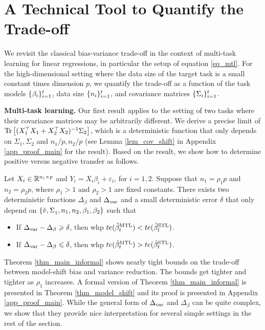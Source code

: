 \section{A Technical Tool to Quantify the Trade-off}
\label{sec_main}

We revisit the classical bias-variance trade-off in the context of multi-task learning for linear regressions, in particular the setup of equation \eqref{eq_mtl}.
For the high-dimensional setting where the data size of the target task is a small constant times dimension $p$, we quantify the trade-off as a function of the task models $\{\beta_i\}_{i=1}^t$, data size $\{n_i\}_{i=1}^t$, and covariance matrices $\{\Sigma_i\}_{i=1}^t$.

\textbf{Multi-task learning.} Our first result applies to the setting of two tasks where their covariance matrices may be arbitrarily different.
We derive a precise limit of $\operatorname{Tr}\left[(X_1^{\top}X_1 + X_2^{\top}X_2)^{-1}\Sigma_2\right]$, which is a deterministic function that only depends on $\Sigma_1, \Sigma_2$ and $n_1/p, n_2/p$ (see Lemma \ref{lem_cov_shift} in Appendix \ref{app_proof_main} for the result).
Based on the result, we show how to determine positive versus negative transfer as follows.

\begin{theorem}[Informal]\label{thm_main_informal}
	Let $X_i \in\mathbb{R}^{n_i \times p}$ and $Y_i = X_i\beta_i + \varepsilon_i$, for $i = 1, 2$.
	Suppose that $n_1 = \rho_1 p$ and $n_2 = \rho_2 p$, where $\rho_1>1$ and $\rho_2 >1$ are fixed constants.
	There exists two deterministic functions $\Delta_{\beta}$ and $\Delta_{\text{var}}$ and a small deterministic error $\delta$ that only depend on $\{\hat{v}, \Sigma_1^{}, n_1, n_2, \beta_1, \beta_2\}$ such that
	\begin{itemize}
		\item If $\Delta_{\text{var}} - \Delta_{\beta} \geqslant \delta$, then whp $te(\hat{\beta}_t^{\text{MTL}}) < te(\hat{\beta}_t^{\text{STL}})$.
		\item If $\Delta_{\text{var}} - \Delta_{\beta} \leqslant \delta$, then whp $te(\hat{\beta}_t^{\text{MTL}}) > te(\hat{\beta}_t^{\text{STL}})$.
	\end{itemize}
\end{theorem}

Theorem \ref{thm_main_informal} shows nearly tight bounds on the trade-off between model-shift bias and variance reduction.
The bounds get tighter and tighter as $\rho_1$ increases.
A formal version of Theorem \ref{thm_main_informal} is presented in Theorem \ref{thm_model_shift} and its proof is presented in Appendix \ref{app_proof_main}.
While the general form of $\Delta_{\text{var}}$ and $\Delta_{\beta}$ can be quite complex, we show that they provide nice interpretation for several simple settings in the rest of the section.

